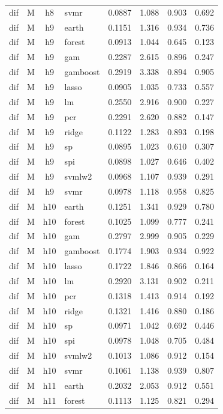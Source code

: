 \begin{ThreePartTable}
\begin{longtable}[t]{llclcccc}
dif & M & h8 & svmr & 0.0887 & 1.088 & 0.903 & 0.692\\
\addlinespace
dif & M & h9 & earth & 0.1151 & 1.316 & 0.934 & 0.736\\
dif & M & h9 & forest & 0.0913 & 1.044 & 0.645 & 0.123\\
dif & M & h9 & gam & 0.2287 & 2.615 & 0.896 & 0.247\\
dif & M & h9 & gamboost & 0.2919 & 3.338 & 0.894 & 0.905\\
dif & M & h9 & lasso & 0.0905 & 1.035 & 0.733 & 0.557\\
dif & M & h9 & lm & 0.2550 & 2.916 & 0.900 & 0.227\\
dif & M & h9 & pcr & 0.2291 & 2.620 & 0.882 & 0.147\\
dif & M & h9 & ridge & 0.1122 & 1.283 & 0.893 & 0.198\\
dif & M & h9 & sp & 0.0895 & 1.023 & 0.610 & 0.307\\
dif & M & h9 & spi & 0.0898 & 1.027 & 0.646 & 0.402\\
dif & M & h9 & svmlw2 & 0.0968 & 1.107 & 0.939 & 0.291\\
dif & M & h9 & svmr & 0.0978 & 1.118 & 0.958 & 0.825\\
\addlinespace
dif & M & h10 & earth & 0.1251 & 1.341 & 0.929 & 0.780\\
dif & M & h10 & forest & 0.1025 & 1.099 & 0.777 & 0.241\\
dif & M & h10 & gam & 0.2797 & 2.999 & 0.905 & 0.229\\
dif & M & h10 & gamboost & 0.1774 & 1.903 & 0.934 & 0.922\\
dif & M & h10 & lasso & 0.1722 & 1.846 & 0.866 & 0.164\\
dif & M & h10 & lm & 0.2920 & 3.131 & 0.902 & 0.211\\
dif & M & h10 & pcr & 0.1318 & 1.413 & 0.914 & 0.192\\
dif & M & h10 & ridge & 0.1321 & 1.416 & 0.880 & 0.186\\
dif & M & h10 & sp & 0.0971 & 1.042 & 0.692 & 0.446\\
dif & M & h10 & spi & 0.0978 & 1.048 & 0.705 & 0.484\\
dif & M & h10 & svmlw2 & 0.1013 & 1.086 & 0.912 & 0.154\\
dif & M & h10 & svmr & 0.1061 & 1.138 & 0.939 & 0.807\\
\addlinespace
dif & M & h11 & earth & 0.2032 & 2.053 & 0.912 & 0.551\\
dif & M & h11 & forest & 0.1113 & 1.125 & 0.821 & 0.294\\

\end{longtable}
\end{ThreePartTable}
